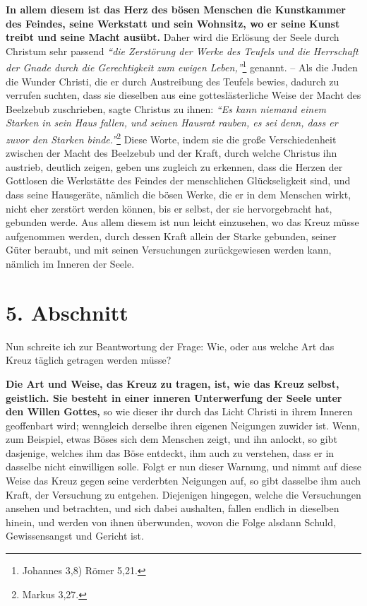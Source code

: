 \label{ref:03_04_reich_des_boesen}
\textbf{In allem diesem ist das Herz des bösen Menschen die Kunstkammer des
Feindes, seine Werkstatt und sein Wohnsitz, wo er seine Kunst treibt und seine
Macht ausübt.} Daher wird die Erlösung der Seele durch Christum sehr passend
\textit{"`die Zerstörung der Werke des Teufels und die Herrschaft der Gnade
durch die Gerechtigkeit zum ewigen Leben,"'}\footnote{Johannes 3,8) Römer 5,21.}
genannt. -- Als
die Juden die Wunder Christi, die er durch Austreibung des Teufels bewies,
dadurch zu verrufen suchten, dass sie dieselben aus eine gotteslästerliche Weise
der Macht des Beelzebub zuschrieben, sagte Christus zu ihnen:
\textit{"`Es kann niemand einem Starken in sein Haus fallen, und seinen
Hausrat rauben, es sei denn, dass er zuvor den Starken binde."'}\footnote{Markus
3,27.}
Diese Worte, indem sie die
große Verschiedenheit zwischen der Macht des Beelzebub und der Kraft, durch
welche Christus ihn austrieb, deutlich zeigen, geben uns zugleich zu erkennen,
dass die Herzen der Gottlosen die Werkstätte des Feindes der menschlichen
Glückseligkeit sind, und dass seine Hausgeräte, nämlich die bösen Werke, die er
in dem Menschen wirkt, nicht eher zerstört werden können, bis er selbst, der
sie hervorgebracht hat, gebunden werde. Aus allem diesem ist nun leicht
einzusehen, wo das Kreuz müsse aufgenommen werden, durch dessen Kraft allein der
Starke gebunden, seiner Güter beraubt, und mit seinen Versuchungen
zurückgewiesen werden kann, nämlich im Inneren der Seele.

\section{5. Abschnitt} \label{kap3_ab5}

Nun schreite ich zur Beantwortung der Frage: Wie, oder aus welche Art das Kreuz
täglich getragen werden müsse?

\medskip

\label{ref:03_05_kreuz_auf_sich_nehmen}
\textbf{Die Art und Weise, das Kreuz zu tragen, ist, wie das Kreuz selbst,
geistlich.
Sie besteht in einer inneren Unterwerfung der Seele unter den Willen Gottes,} so
wie dieser ihr durch das Licht Christi in ihrem Inneren geoffenbart wird;
wenngleich derselbe ihren eigenen Neigungen zuwider ist. Wenn, zum Beispiel,
etwas Böses sich dem Menschen zeigt, und ihn anlockt, so gibt dasjenige,
welches ihm das Böse entdeckt, ihm auch zu verstehen, dass er in dasselbe nicht
einwilligen solle. Folgt er nun dieser Warnung, und nimmt auf diese Weise das
Kreuz gegen seine verderbten Neigungen auf, so gibt dasselbe ihm auch Kraft,
der Versuchung zu entgehen. Diejenigen hingegen, welche die Versuchungen ansehen
und betrachten, und sich dabei aushalten, fallen endlich in dieselben hinein,
und werden von ihnen überwunden, wovon die Folge alsdann Schuld, Gewissensangst
und Gericht ist.

